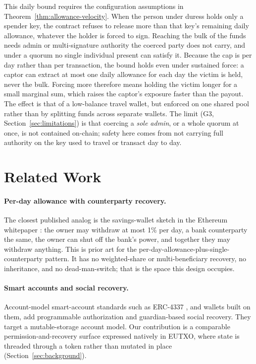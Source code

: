 \documentclass[11pt,DIV=11,parskip=half-]{scrartcl}
\begin{document}
\begin{description}[leftmargin=1.4em,style=nextline]
\item[Physical coercion (the ``wrench attack'').] This daily bound requires the configuration assumptions in Theorem~\ref{thm:allowance-velocity}. When the person under duress holds only a spender key, the contract refuses to release more than that key's remaining daily allowance, whatever the holder is forced to sign. Reaching the bulk of the funds needs admin or multi-signature authority the coerced party does not carry, and under a quorum no single individual present can satisfy it. Because the cap is per day rather than per transaction, the bound holds even under sustained force: a captor can extract at most one daily allowance for each day the victim is held, never the bulk. Forcing more therefore means holding the victim longer for a small marginal sum, which raises the captor's exposure faster than the payout. The effect is that of a low-balance travel wallet, but enforced on one shared pool rather than by splitting funds across separate wallets. The limit (G3, Section~\ref{sec:limitations}) is that coercing a \emph{sole admin}, or a whole quorum at once, is not contained on-chain; safety here comes from not carrying full authority on the key used to travel or transact day to day.
\end{description}

\FloatBarrier
\section{Related Work}
\label{sec:related}

\paragraph{Per-day allowance with counterparty recovery.} The closest published analog is the savings-wallet sketch in the Ethereum whitepaper \cite{buterinWhitepaper}: the owner may withdraw at most 1\% per day, a bank counterparty the same, the owner can shut off the bank's power, and together they may withdraw anything. This is prior art for the per-day-allowance-plus-single-counterparty pattern. It has no weighted-share or multi-beneficiary recovery, no inheritance, and no dead-man-switch; that is the space this design occupies.

\paragraph{Smart accounts and social recovery.} Account-model smart-account standards such as ERC-4337 \cite{eip4337}, and wallets built on them, add programmable authorization and guardian-based social recovery. They target a mutable-storage account model. Our contribution is a comparable permission-and-recovery surface expressed natively in EUTXO, where state is threaded through a token rather than mutated in place (Section~\ref{sec:background}).
\end{document}
